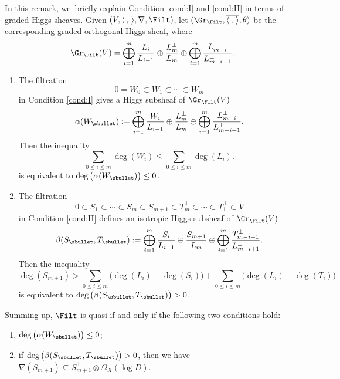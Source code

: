 \begin{rem}\label{explainregular}
In this remark, we~briefly explain Condition \eqref{cond:I} and \eqref{cond:II} in terms of graded Higgs sheaves. Given $(V, \langle \,, \, \rangle, \nabla, \Filt)$, let $(\Gr_{\Filt}, \overline{\langle \,, \, \rangle}, \theta)$ be the corresponding graded orthogonal Higgs sheaf, where
\begin{align*}
\Gr_{\Filt}(V)=\mathop{\bigoplus}_{i=1}^{m} \frac{L_i}{L_{i-1}}\oplus \frac{L_m^\perp}{L_m}\oplus \mathop{\bigoplus}_{i=1}^{m} \frac{L_{m-i}^\perp}{L_{m-i+1}^\perp}.
\end{align*}

\begin{enumerate}
\item The filtration
\[
0=W_0\subset W_1 \subset \cdots\subset W_m
\]
in Condition \eqref{cond:I} gives a Higgs subsheaf of $\Gr_{\Filt}(V)$
\[
\alpha(W_\sbullet):=\mathop{\bigoplus}_{i=1}^{m} \frac{W_i}{L_{i-1}}\oplus \frac{L_m^\perp}{L_m}\oplus \mathop{\bigoplus}_{i=1}^{m} \frac{L_{m-i}^\perp}{L_{m-i+1}^\perp}.
\]
Then the inequality
\[
\sum_{0\leq i\leq m}\deg(W_i)\leqslant\sum_{0\leq i\leq m}\deg(L_i).
\]
is equivalent to $\deg\big(\alpha(W_\sbullet)\big)\leq 0$. 
\item The filtration
\[
0\subset S_1 \subset \cdots\subset S_m\subset S_{m+1}\subset T_m^\perp\subset\cdots \subset T_1^\perp\subset V
\]
in Condition \eqref{cond:II} defines an isotropic Higgs subsheaf of $\Gr_{\Filt}(V)$
\[
\beta(S_\sbullet,T_\sbullet):=\mathop{\bigoplus}_{i=1}^{m} \frac{S_i}{L_{i-1}}\oplus \frac{S_{m+1}}{L_m}\oplus \mathop{\bigoplus}_{i=1}^{m} \frac{T_{m-i+1}^\perp}{L_{m-i+1}^\perp}.
\]
Then the inequality
\[
\deg(S_{m+1})>\sum_{0\leq i\leq m}\big(\deg(L_i)-\deg(S_i)\big)+\sum_{0\leq i\leq m}\big(\deg(L_i)-\deg(T_i)\big)
\]
is equivalent to $\deg\big(\beta(S_\sbullet,T_\sbullet)\big)>0$.
\end{enumerate}

Summing up, $\Filt$ is quasi \grsemistable if and only if the following two conditions hold:
\begin{enumerate}
\item $\deg\big(\alpha(W_\sbullet)\big)\leq 0$;

\item if $\deg\big(\beta(S_\sbullet,T_\sbullet)\big)>0$, then we have $\nabla(S_{m+1})\subseteq S_{m+1}^\perp \otimes\Omega_X(\log D)$.
\end{enumerate}
\end{rem}

